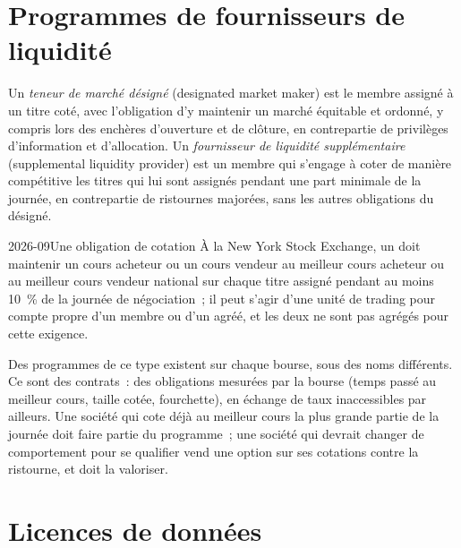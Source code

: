 \section{Programmes de fournisseurs de liquidité}

\begin{definition}\label{def:m1:getting-access-equities:dmm}
Un \emph{teneur de marché désigné} (designated market maker) est le
membre assigné à un titre coté, avec l'obligation d'y maintenir un marché équitable et
ordonné, y compris lors des enchères d'ouverture et de clôture, en contrepartie de
privilèges d'information et d'allocation. Un \emph{fournisseur de liquidité
supplémentaire} (supplemental liquidity provider) est un membre qui s'engage à coter
de manière compétitive les titres qui lui sont assignés pendant une part minimale de la journée, en contrepartie de
ristournes majorées, sans les autres
obligations du  désigné.
\end{definition}

\begin{dated}{2026-09}{Une obligation de cotation}\label{dat:m1:getting-access-equities:slp}
À la New York Stock Exchange, un  doit maintenir un cours
acheteur ou un cours vendeur au meilleur cours acheteur ou au meilleur cours vendeur national sur chaque
titre assigné pendant au moins 10~\% de la journée de négociation~; il peut s'agir d'une unité de
trading pour compte propre d'un membre ou d'un  agréé, et les deux ne sont pas
agrégés pour cette exigence.
\end{dated}

Des programmes de ce type existent sur chaque bourse, sous des noms différents.
Ce sont des contrats~: des obligations mesurées par la bourse (temps passé au meilleur cours, taille
cotée, fourchette), en échange de taux inaccessibles par ailleurs. Une société qui cote déjà
au meilleur cours la plus grande partie de la journée doit faire partie du programme~; une société
qui devrait changer de comportement pour se qualifier vend une option sur ses cotations contre la
ristourne, et doit la valoriser.

\section{Licences de données}

